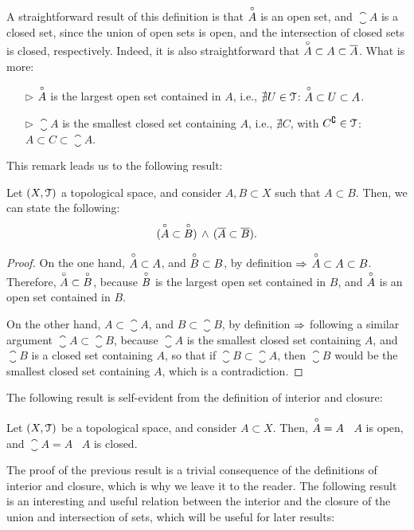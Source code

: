 \begin{remark}
	A straightforward result of this definition is that $\overset{\circ}{A}$ is an open set, and $\closure{A}$ is a closed set, since the union of open sets is open, and the intersection of closed sets is closed, respectively.
	Indeed, it is also straightforward that $\overset{\circ}{A}\subset A\subset \overline{A}$.
	What is more:
	\begin{itemize}
		\item[$\triangleright$] $\overset{\circ}{A}$ is the largest open set contained in $A$, i.e., $\nexists U\in \EuScript{T}$: $\overset{\circ}{A}\subset U\subset A$.
		\item[$\triangleright$] $\closure{A}$ is the smallest closed set containing $A$, i.e., $\nexists C$, with $C^\complement\in \EuScript{T}$: $A\subset C\subset \closure{A}$.
	\end{itemize}
\end{remark}
This remark leads us to the following result:
\begin{lemma}
	\label{lem:interior-closure-subsets}
	Let $(X, \EuScript{T})$ a topological space, and consider $A, B\subset X$ such that $A\subset B$. Then, we can state the following:
	\[
		(\overset{\circ}{A}\subset\overset{\circ}{B})\,\land\,(\overline{A}\subset\overline{B}).
	\]
\end{lemma}
\begin{proof}
	On the one hand, $\overset{\circ}{A}\subset A$, and $\overset{\circ}{B}\subset B$, by definition $\Rightarrow$ $\overset{\circ}{A}\subset A\subset B$. Therefore, $\overset{\circ}{A}\subset\overset{\circ}{B}$, because $\overset{\circ}{B}$ is the largest open set contained in $B$, and $\overset{\circ}{A}$ is an open set contained in $B$.

	On the other hand, $A\subset \closure{A}$, and $B \subset \closure{B}$, by definition $\Rightarrow$ following a similar argument $\closure{A}\subset \closure{B}$, because $\closure{A}$ is the smallest closed set containing $A$, and $\closure{B}$ is a closed set containing $A$, so that if $\closure{B}\subset \closure{A}$, then $\closure{B}$ would be the smallest closed set containing $A$, which is a contradiction.
\end{proof}
The following result is self-evident from the definition of interior and closure:
\begin{lemma}
	\label{lem:interior-open-closure-closed}
	Let $(X, \EuScript{T})$ be a topological space, and consider $A\subset X$. Then, $\overset{\circ}{A} = A$ \iff\ $A$ is open, and $\closure{A} = A$ \iff\ $A$ is closed.
\end{lemma}
The proof of the previous result is a trivial consequence of the definitions of interior and closure, which is why we leave it to the reader. The following result is an interesting and useful relation between the interior and the closure of the union and intersection of sets, which will be useful for later results:
